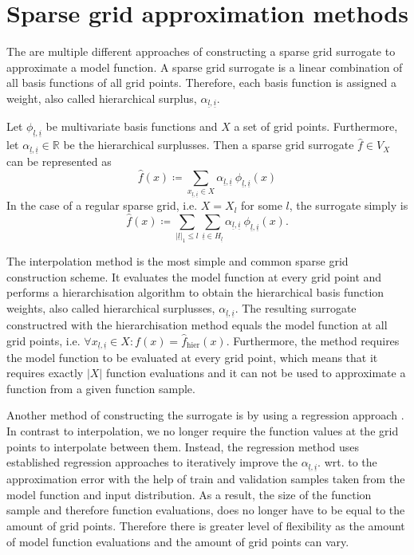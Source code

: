 \documentclass[
  a4paper,  %
  twoside,  %
  bibliography=totoc,
  headsepline,
  cleardoublepage=empty,
  parskip=half,
  draft=false
]{scrbook}
\begin{document}
\section{Sparse grid approximation methods}

The are multiple different approaches of constructing a sparse grid surrogate to approximate a model function.
A sparse grid surrogate is a linear combination of all basis functions of all grid points.
Therefore, each basis function is assigned a weight, also called hierarchical surplus, $\alpha_{\underline{l},\underline{i}}$.

\begin{definition}
Let $\phi_{\underline{l},\underline{i}}$ be multivariate basis functions and $X$ a set of grid points.
Furthermore, let $\alpha_{\underline{l},\underline{i}} \in \mathds{R}$ be the hierarchical surplusses.
Then a sparse grid surrogate $\hat{f} \in V_X$ can be represented as
\begin{equation}
\hat{f}(x) \coloneqq \sum_{x_{\underline{l},\underline{i}} \in X} \alpha_{\underline{l},\underline{i}} ~ \phi_{
\underline{l},\underline{i}}(x)
\end{equation}
In the case of a regular sparse grid, i.e. $X=X_{l}$ for some $l$, the surrogate simply is
\begin{equation}
\hat{f}(x) \coloneqq \sum_{|\underline{l}|_1 \leq l} \sum_{\underline{i} \in {H_{\underline{l}}}} \alpha_{\underline{l},\underline{i}} ~ \phi_{
\underline{l},\underline{i}}(x).
\end{equation}
\end{definition}

The interpolation method is the most simple and common sparse grid construction scheme.
It evaluates the model function at every grid point and performs a hierarchisation algorithm \cite{} to obtain the hierarchical basis function weights, also called hierarchical surplusses, $\alpha_{\underline{l},\underline{i}}$.
The resulting surrogate constructred with the hierarchisation method equals the model function at all grid points, i.e. $\forall x_{\underline{l},\underline{i}} \in X \colon f(x)=\hat{f}_{\text{hier}}(x)$.
Furthermore, the method requires the model function to be evaluated at every grid point, which means that it requires exactly $|X|$ function evaluations and it can not be used to approximate a function from a given function sample.

Another method of constructing the surrogate is by using a regression approach \cite{}.
In contrast to interpolation, we no longer require the function values at the grid points to interpolate between them.
Instead, the regression method uses established regression approaches to iteratively improve the $\alpha_{\underline{l},\underline{i}}$. wrt. to the approximation error with the help of train and validation samples taken from the model function and input distribution.
As a result, the size of the function sample and therefore function evaluations, does no longer have to be equal to the amount of grid points.
Therefore there is greater level of flexibility as the amount of model function evaluations and the amount of grid points can vary.
\end{document}
